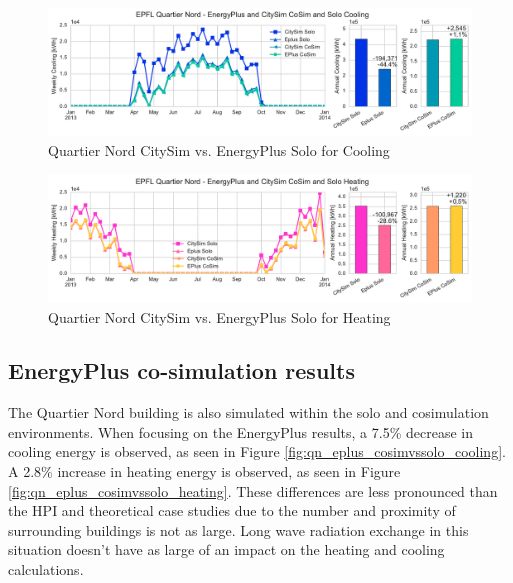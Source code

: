 \documentclass{tBPS2e}
\theoremstyle{plain}
\theoremstyle{definition}
\theoremstyle{remark}
\newcommand{\noteCM}[1]{\footnote{\textcolor{red}{#1}}}
\newcommand{\noteDT}[1]{\footnote{\textcolor{green}{#1}}}
\begin{document}


\begin{figure}[H]
\centering
\includegraphics[scale=0.55]{figures/QN_Cooling}
\caption{Quartier Nord CitySim vs. EnergyPlus Solo for Cooling}
\label{fig:qn_eplusvscitysim_cooling}
\end{figure}

\begin{figure}[H]
\centering
\includegraphics[scale=0.55]{figures/QN_Heating.pdf}
\caption{Quartier Nord CitySim vs. EnergyPlus Solo for Heating}
\label{fig:qn_eplusvscitysim_heating}
\end{figure}

\subsection{EnergyPlus co-simulation results}
The Quartier Nord building is also simulated within the solo and
cosimulation environments. When
focusing on the EnergyPlus results, a 7.5\% decrease in cooling energy is
observed, as seen in Figure
\ref{fig:qn_eplus_cosimvssolo_cooling}. A 2.8\% increase in heating energy is
observed, as seen in Figure
\ref{fig:qn_eplus_cosimvssolo_heating}. These differences are less pronounced
than the HPI and theoretical case studies due to the number and proximity of
surrounding buildings is not as large. Long wave radiation exchange in this situation 
doesn't have as large of an impact on the heating and cooling calculations.
\end{document}
